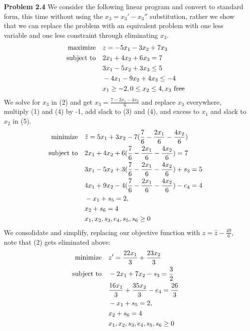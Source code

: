 \documentclass{article}
\begin{document}
\textbf{Problem 2.4} We consider the following linear program and convert to standard form, this time without using the $x_3 = x_3' - x_3''$ substitution, rather we show that we can replace the problem with an equivalent problem with one less variable and one less constraint through eliminating $x_3$.
\begin{align}
    \text{maximize} &\null \quad z = -5x_1 - 3x_2 + 7x_3 \\ 
    \text{subject to} &\null \quad 2x_1 + 4x_2 + 6x_3 = 7 \\
    & \quad 3x_1 - 5x_2 + 3x_3 \leq 5 \\
    & \quad -4x_1 - 9x_2 + 4x_3 \leq -4 \\
    & \quad x_1 \geq -2, 0 \leq x_2 \leq 4, x_3 \text{ free}
\end{align} 
We solve for $x_3$ in (2) and get $x_3 = \frac{7- 2x_1 - 4x_2}{6}$ and replace $x_3$ everywhere, multiply (1) and (4) by -1, add slack to (3) and (4), and excess to $x_1$ and slack to $x_2 $ in (5). 
\begin{align}
    \text{minimize} &\null \quad \hat{z} = 5x_1 + 3x_2 - 7(\frac{7}{6} - \frac{2x_1}{6} - \frac{4x_2}{6})  \\ 
    \text{subject to} &\null \quad 2x_1 + 4x_2 + 6(\frac{7}{6} - \frac{2x_1}{6} - \frac{4x_2}{6})  = 7 \\
    & \quad 3x_1 - 5x_2 + 3(\frac{7}{6} - \frac{2x_1}{6} - \frac{4x_2}{6})  + s_3 = 5 \\
    & \quad 4x_1 + 9x_2 - 4(\frac{7}{6} - \frac{2x_1}{6} - \frac{4x_2}{6})  - e_4 = 4 \\
    & \quad -x_1 + s_5 = 2, \\
    & \quad x_2 + s_6 = 4 \\
    & \quad x_1, x_2, s_3, e_4,s_5, s_6 \geq 0
\end{align}
We consolidate and simplify, replacing our objective function with $z = \hat{z} - \frac{49}{6}$, note that (2) gets eliminated above:
\begin{align*}
    \text{minimize} &\null \quad z' = \frac{22x_1}{3} + \frac{23x_2}{3} \\ 
    \text{subject to} &\null \quad -2x_1 + 7x_2  - s_3 = \frac{3}{2} \\
    & \quad \frac{16x_1}{3} + \frac{35x_2}{3} - e_4 = \frac{26}{3} \\
    & \quad -x_1 + s_5 = 2, \\
    & \quad x_2 + s_6 = 4 \\ 
    & \quad x_1, x_2, s_3, e_4,s_5, s_6 \geq 0
\end{align*}
\end{document}
